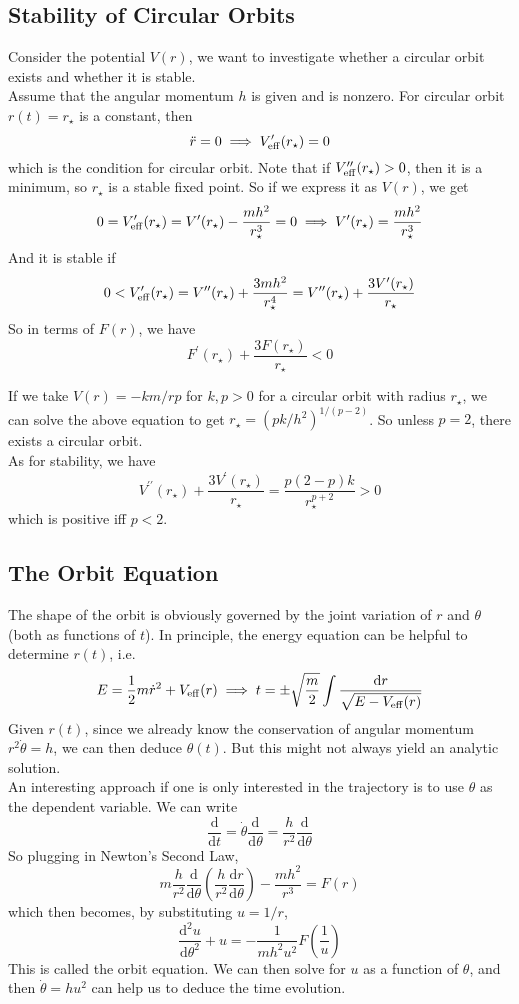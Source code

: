 \subsection{Stability of Circular Orbits}
Consider the potential $V(r)$, we want to investigate whether a circular orbit exists and whether it is stable.\\
Assume that the angular momentum $h$ is given and is nonzero.
For circular orbit $r(t)=r_\star$ is a constant, then
$$\ddot{r}=0\implies V_{\rm eff}^\prime(r_\star)=0$$
which is the condition for circular orbit.
Note that if $V_{\rm eff}^{\prime\prime}(r_\star)>0$, then it is a minimum, so $r_\star$ is a stable fixed point.
So if we express it as $V(r)$, we get
$$0=V_{\rm eff}^\prime(r_\star)=V^\prime(r_\star)-\frac{mh^2}{r_\star^3}=0\implies V^\prime(r_\star)=\frac{mh^2}{r_\star^3}$$
And it is stable if
$$0<V_{\rm eff}^\prime(r_\star)=V^{\prime\prime}(r_\star)+\frac{3mh^2}{r_\star^4}=V^{\prime\prime}(r_\star)+\frac{3V^\prime(r_\star)}{r_\star}$$
So in terms of $F(r)$, we have
$$F^{\prime}(r_\star)+\frac{3F(r_\star)}{r_\star}<0$$
\begin{example}
    If we take $V(r)=-km/rp$ for $k,p>0$ for a circular orbit with radius $r_\star$, we can solve the above equation to get $r_\star=(pk/h^2)^{1/(p-2)}$.
    So unless $p=2$, there exists a circular orbit.\\
    As for stability, we have
    $$V^{\prime\prime}(r_\star)+\frac{3V^\prime(r_\star)}{r_\star}=\frac{p(2-p)k}{r_\star^{p+2}}>0$$
    which is positive iff $p<2$.
\end{example}
\subsection{The Orbit Equation}
The shape of the orbit is obviously governed by the joint variation of $r$ and $\theta$ (both as functions of $t$).
In principle, the energy equation can be helpful to determine $r(t)$, i.e.
$$E=\frac{1}{2}m\dot{r}^2+V_{\rm eff}(r)\implies t=\pm\sqrt{\frac{m}{2}}\int\frac{\mathrm dr}{\sqrt{E-V_{\rm eff}(r)}}$$
Given $r(t)$, since we already know the conservation of angular momentum $r^2\dot\theta=h$, we can then deduce $\theta(t)$.
But this might not always yield an analytic solution.\\
An interesting approach if one is only interested in the trajectory is to use $\theta$ as the dependent variable.
We can write
$$\frac{\mathrm d}{\mathrm dt}=\dot\theta\frac{\mathrm d}{\mathrm d\theta}=\frac{h}{r^2}\frac{\mathrm d}{\mathrm d\theta}$$
So plugging in Newton's Second Law,
$$m\frac{h}{r^2}\frac{\mathrm d}{\mathrm d\theta}\left( \frac{h}{r^2}\frac{\mathrm dr}{\mathrm d\theta} \right)-\frac{mh^2}{r^3}=F(r)$$
which then becomes, by substituting $u=1/r$,
$$\frac{\mathrm d^2u}{\mathrm d\theta^2}+u=-\frac{1}{mh^2u^2}F\left(\frac{1}{u}\right)$$
This is called the orbit equation.
We can then solve for $u$ as a function of $\theta$, and then $\dot\theta=hu^2$ can help us to deduce the time evolution.
